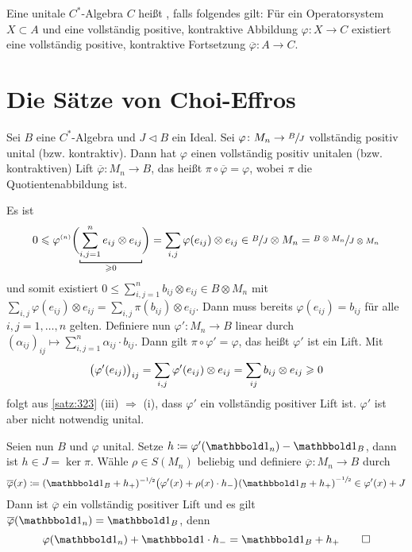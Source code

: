 \begin{definition}[{name=[injektive C*-Algebra]}]
	Eine unitale $C^*$-Algebra $C$ heißt , falls folgendes gilt:
	Für ein Operatorsystem $X \subset A$ und eine vollständig positive, kontraktive Abbildung $\varphi \colon X \to C$ existiert eine vollständig positive, kontraktive Fortsetzung $\overline{\varphi} \colon A \to C$.
\end{definition}
\newpage

\section{Die Sätze von Choi-Effros} %
\label{sec:4}

\begin{proposition}[label=prop:41]
	Sei $B$ eine $C^*$-Algebra und $J \lhd B$ ein Ideal.
	Sei $\varphi \colon M_n \to \sfrac{B}{J}$ vollständig positiv  unital (bzw. kontraktiv).
	Dann hat $\varphi$ einen vollständig positiv unitalen (bzw. kontraktiven) Lift $\overline{\varphi} \colon M_n \to B$, das heißt $\pi \circ \overline{\varphi} = \varphi$, wobei $\pi$ die Quotientenabbildung ist.
\end{proposition}
\begin{beweis}
	Es ist 
	\[
		0 \le \varphi^\ssbrace{n}\enbrace[\bigg]{\Underbracket{\sum_{i,j=1}^{n} e_{ij} \otimes e_{ij}}{\ge 0}} = \sum_{i,j} \varphi(e_{ij}) \otimes e_{ij} \in \sfrac{B}{J} \otimes M_n = \sfrac{B \otimes M_n}{J \otimes M_n}
	\]
	und somit existiert $0 \le \sum_{i,j=1}^{n} b_{ij} \otimes e_{ij} \in B \otimes M_n$ mit $\sum_{i,j} \varphi(e_{ij}) \otimes e_{ij} = \sum_{i,j} \pi(b_{ij}) \otimes e_{ij}$.
	Dann muss bereits $\varphi(e_{ij})=b_{ij}$ für alle $i,j=1,\ldots,n$ gelten.
	Definiere nun $\varphi' \colon M_n \to B$ linear durch $(\alpha_{ij})_{ij} \mapsto \sum_{i,j=1}^{n} \alpha_{ij} \cdot b_{ij}$.
	Dann gilt $\pi \circ \varphi' = \varphi$, das heißt $\varphi'$ ist ein Lift.
	Mit 
	\[
		\enbrace[\big]{\varphi'(e_{ij})}_{ij} = \sum_{i,j} \varphi'(e_{ij}) \otimes e_{ij} = \sum_{ij} b_{ij} \otimes e_{ij} \ge 0
	\]
	folgt aus \autoref{satz:323} (iii) $\Rightarrow$ (i), dass $\varphi'$ ein vollständig positiver Lift ist.
	$\varphi'$ ist aber nicht notwendig unital.
	
	Seien nun $B$ und $\varphi$ unital.
	Setze $h \coloneqq \varphi' (\ind_n) - \ind_B$, dann ist $h \in J = \ker \pi$.
	Wähle $\rho \in S(M_n)$ beliebig und definiere $\overline{\varphi} \colon M_n \to B$ durch
	\[
		\overline{\varphi}(x) \coloneqq (\ind_B + h_+)^{-\sfrac{1}{2}}\enbrace[\big]{\varphi'(x)+ \rho(x) \cdot h_-} \enbrace*{\ind_B + h_+}^{-\sfrac{1}{2}} \in \varphi'(x) + J
	\]
	Dann ist $\overline{\varphi}$ ein vollständig positiver Lift und es gilt $\overline{\varphi}(\ind_n) = \ind_B$, denn
	\[
		\varphi(\ind_n) + \ind \cdot h_- = \ind_B + h_+ \qedhere
	\]
\end{beweis}

